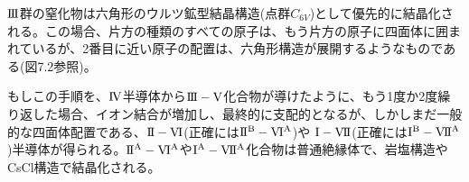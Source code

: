 \documentclass[11pt,a4j,uplatex]{jsarticle}
\begin{document}
$\mathrm{I\hspace{-1pt}I\hspace{-1pt}I}$群の窒化物は六角形のウルツ鉱型結晶構造(点群$C_{6V}$)として優先的に結晶化される。この場合、片方の種類のすべての原子は、もう片方の原子に四面体に囲まれているが、2番目に近い原子の配置は、六角形構造が展開するようなものである(図7.2参照)。

もしこの手順を、$\mathrm{I\hspace{-1pt}V}$半導体から$\mathrm{I\hspace{-1pt}I\hspace{-1pt}I-V}$化合物が導けたように、もう1度か2度繰り返した場合、イオン結合が増加し、最終的に支配的となるが、しかしまだ一般的な四面体配置である、$\mathrm{I\hspace{-1pt}I-V\hspace{-1pt}I}$(正確には$\mathrm{I\hspace{-1pt}I^B-V\hspace{-1pt}I^A}$)や%
$\mathrm{I-V\hspace{-1pt}I\hspace{-1pt}I}$(正確には$\mathrm{I^B-V\hspace{-1pt}I\hspace{-1pt}I^A}$)半導体が得られる。$\mathrm{I\hspace{-1pt}I^A-V\hspace{-1pt}I^A}$や$\mathrm{I^A-V\hspace{-1pt}I\hspace{-1pt}I^A}$化合物は普通絶縁体で、岩塩構造やCsCl構造で結晶化される。
\end{document}
